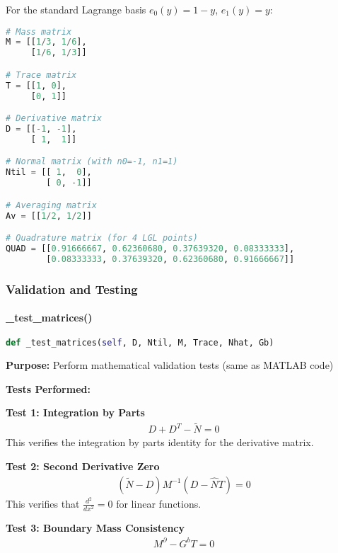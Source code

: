 For the standard Lagrange basis $e_0(y) = 1-y$, $e_1(y) = y$:

\begin{lstlisting}[language=Python, caption=Lagrange Basis Matrix Values]
# Mass matrix
M = [[1/3, 1/6],
     [1/6, 1/3]]

# Trace matrix  
T = [[1, 0],
     [0, 1]]

# Derivative matrix
D = [[-1, -1],
     [ 1,  1]]

# Normal matrix (with n0=-1, n1=1)
Ntil = [[ 1,  0],
        [ 0, -1]]

# Averaging matrix
Av = [[1/2, 1/2]]

# Quadrature matrix (for 4 LGL points)
QUAD = [[0.91666667, 0.62360680, 0.37639320, 0.08333333],
        [0.08333333, 0.37639320, 0.62360680, 0.91666667]]
\end{lstlisting}

\subsubsection{Validation and Testing}

\paragraph{\_test\_matrices()}\leavevmode
\begin{lstlisting}[language=Python, caption=Test Matrices Method]
def _test_matrices(self, D, Ntil, M, Trace, Nhat, Gb)
\end{lstlisting}

\textbf{Purpose:} Perform mathematical validation tests (same as MATLAB code)

\textbf{Tests Performed:}

\textbf{Test 1: Integration by Parts}
\begin{align}
D + D^T - \tilde{N} = 0
\end{align}
This verifies the integration by parts identity for the derivative matrix.

\textbf{Test 2: Second Derivative Zero}
\begin{align}
(\tilde{N} - D) M^{-1} (D - \hat{N} T) = 0
\end{align}
This verifies that $\frac{d^2}{dx^2} = 0$ for linear functions.

\textbf{Test 3: Boundary Mass Consistency}
\begin{align}
M^{\partial} - G^b T = 0
\end{align}


